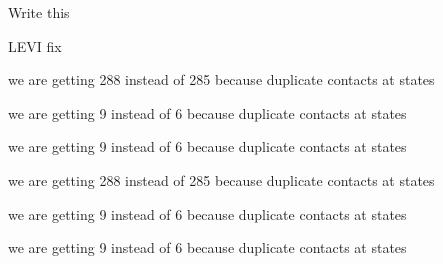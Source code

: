 \begin{DoxyRefList}
%
Write this  
\item[Member \mbox{\hyperlink{namespacetesseract__visualization_a88be2799de33d5369c59ee9eafb62e41}{tesseract\+\_\+visualization\+::add\+Cylinder}} (\mbox{\hyperlink{classtesseract__visualization_1_1EntityManager}{Entity\+Manager}} \&entity\+\_\+manager, ignition\+::msgs\+::\+Link \&link, long \&sub\+\_\+index, const Eigen\+::\+Ref$<$ const Eigen\+::\+Vector3d $>$ \&pt1, const Eigen\+::\+Ref$<$ const Eigen\+::\+Vector3d $>$ \&pt2, const \mbox{\hyperlink{classtesseract__scene__graph_1_1Material}{tesseract\+\_\+scene\+\_\+graph\+::\+Material}} \&material, const Eigen\+::\+Vector3d \&)]\label{todo__todo000026}%
%
LEVI fix  
\item[Member \mbox{\hyperlink{tesseract__environment__unit_8cpp_a0d0135e86e53fd517ae04252a6fd398c}{TEST}} (Tesseract\+Environment\+Unit, check\+Trajectory\+Unit)]\label{todo__todo000015}%
%
we are getting 288 instead of 285 because duplicate contacts at states 

\label{todo__todo000016}%
%
we are getting 9 instead of 6 because duplicate contacts at states 

\label{todo__todo000017}%
%
we are getting 9 instead of 6 because duplicate contacts at states 

\label{todo__todo000018}%
%
we are getting 288 instead of 285 because duplicate contacts at states 

\label{todo__todo000014}%
%
we are getting 9 instead of 6 because duplicate contacts at states 

\label{todo__todo000013}%
%
we are getting 9 instead of 6 because duplicate contacts at states 


\end{DoxyRefList}
